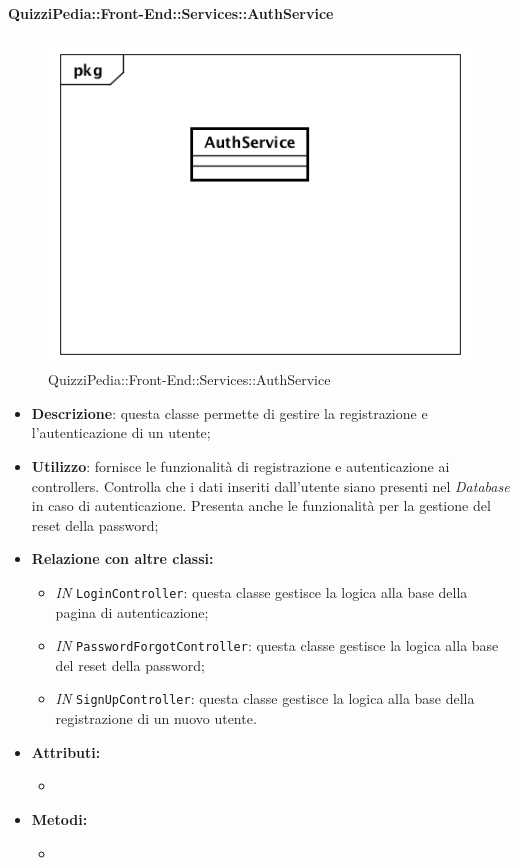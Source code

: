 \paragraph{QuizziPedia::Front-End::Services::AuthService}
\begin{figure}
	\centering
	\includegraphics[scale=0.45]{UML/Classi/Front-End/QuizziPedia_Front-end_Services_ AuthService.png}
	\caption{QuizziPedia::Front-End::Services::AuthService}
\end{figure}
\begin{itemize}
	\item \textbf{Descrizione}: questa classe permette di gestire la registrazione e l'autenticazione di un utente;
	\item \textbf{Utilizzo}: fornisce le funzionalità di registrazione e autenticazione ai controllers. Controlla che i dati inseriti dall'utente siano presenti nel \textit{Database} in caso di autenticazione. Presenta anche le funzionalità per la gestione del reset della password;
	\item \textbf{Relazione con altre classi:}
	\begin{itemize}
		\item \textit{IN} \texttt{LoginController}: questa classe gestisce la logica alla base della pagina di autenticazione;
		\item \textit{IN} \texttt{PasswordForgotController}: questa classe gestisce la logica alla base del reset della password;
		\item \textit{IN} \texttt{SignUpController}: questa classe gestisce la logica alla base della registrazione di un nuovo utente.
	\end{itemize}
	\item \textbf{Attributi:}
	\begin{itemize}
		\item 
	\end{itemize}
	\item \textbf{Metodi:}
	\begin{itemize}
		\item 
	\end{itemize}
\end{itemize}

